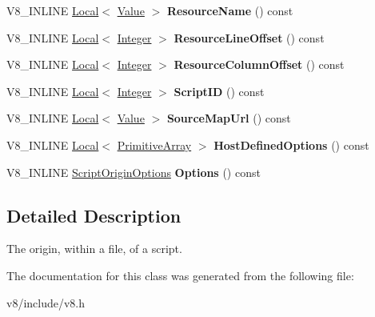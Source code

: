 \begin{DoxyCompactItemize}
\item 
\mbox{\label{classv8_1_1ScriptOrigin_ac9dcd4520325ea2e776ff55aa7992cb1}} 
V8\+\_\+\+I\+N\+L\+I\+NE \mbox{\hyperlink{classv8_1_1Local}{Local}}$<$ \mbox{\hyperlink{classv8_1_1Value}{Value}} $>$ {\bfseries Resource\+Name} () const
\item 
\mbox{\label{classv8_1_1ScriptOrigin_ae9f8419ea44b2b0d9e249f2c6825e8cd}} 
V8\+\_\+\+I\+N\+L\+I\+NE \mbox{\hyperlink{classv8_1_1Local}{Local}}$<$ \mbox{\hyperlink{classv8_1_1Integer}{Integer}} $>$ {\bfseries Resource\+Line\+Offset} () const
\item 
\mbox{\label{classv8_1_1ScriptOrigin_a75794aa0bda3508406b97cf66ac47682}} 
V8\+\_\+\+I\+N\+L\+I\+NE \mbox{\hyperlink{classv8_1_1Local}{Local}}$<$ \mbox{\hyperlink{classv8_1_1Integer}{Integer}} $>$ {\bfseries Resource\+Column\+Offset} () const
\item 
\mbox{\label{classv8_1_1ScriptOrigin_ae4431018214bd4512c6c0f8168ca3101}} 
V8\+\_\+\+I\+N\+L\+I\+NE \mbox{\hyperlink{classv8_1_1Local}{Local}}$<$ \mbox{\hyperlink{classv8_1_1Integer}{Integer}} $>$ {\bfseries Script\+ID} () const
\item 
\mbox{\label{classv8_1_1ScriptOrigin_ae2db076b4c2b206ce1a3242e3a3105fe}} 
V8\+\_\+\+I\+N\+L\+I\+NE \mbox{\hyperlink{classv8_1_1Local}{Local}}$<$ \mbox{\hyperlink{classv8_1_1Value}{Value}} $>$ {\bfseries Source\+Map\+Url} () const
\item 
\mbox{\label{classv8_1_1ScriptOrigin_a90ff0e8c56f7fa08c3d2e88121e49868}} 
V8\+\_\+\+I\+N\+L\+I\+NE \mbox{\hyperlink{classv8_1_1Local}{Local}}$<$ \mbox{\hyperlink{classv8_1_1PrimitiveArray}{Primitive\+Array}} $>$ {\bfseries Host\+Defined\+Options} () const
\item 
\mbox{\label{classv8_1_1ScriptOrigin_a7c3f46da497196187eb53bcec86936cf}} 
V8\+\_\+\+I\+N\+L\+I\+NE \mbox{\hyperlink{classv8_1_1ScriptOriginOptions}{Script\+Origin\+Options}} {\bfseries Options} () const
\end{DoxyCompactItemize}


\subsection{Detailed Description}
The origin, within a file, of a script. 

The documentation for this class was generated from the following file\+:\begin{DoxyCompactItemize}
\item 
v8/include/v8.\+h\end{DoxyCompactItemize}
